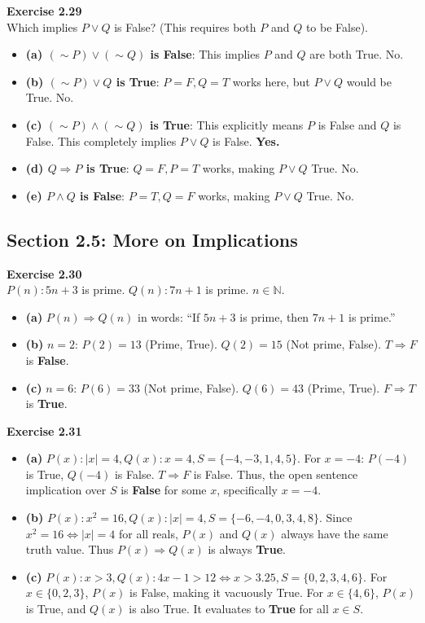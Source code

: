\documentclass[11pt]{article}
\begin{document}
\vspace{10pt}
\textbf{Exercise 2.29} \\
Which implies $P \vee Q$ is False? (This requires both $P$ and $Q$ to be False).
\begin{itemize}
    \item \textbf{(a) $(\sim P) \vee (\sim Q)$ is False}: This implies $P$ and $Q$ are both True. No.
    \item \textbf{(b) $(\sim P) \vee Q$ is True}: $P=F, Q=T$ works here, but $P \vee Q$ would be True. No.
    \item \textbf{(c) $(\sim P) \wedge (\sim Q)$ is True}: This explicitly means $P$ is False and $Q$ is False. This completely implies $P \vee Q$ is False. \textbf{Yes.}
    \item \textbf{(d) $Q \Rightarrow P$ is True}: $Q=F, P=T$ works, making $P \vee Q$ True. No.
    \item \textbf{(e) $P \wedge Q$ is False}: $P=T, Q=F$ works, making $P \vee Q$ True. No.
\end{itemize}

\subsection{Section 2.5: More on Implications}

\textbf{Exercise 2.30} \\
$P(n): 5n+3$ is prime. $Q(n): 7n+1$ is prime. $n \in \mathbb{N}$.
\begin{itemize}
    \item \textbf{(a)} $P(n) \Rightarrow Q(n)$ in words: ``If $5n+3$ is prime, then $7n+1$ is prime.''
    \item \textbf{(b)} $n=2$: $P(2) = 13$ (Prime, True). $Q(2) = 15$ (Not prime, False). $T \Rightarrow F$ is \textbf{False}.
    \item \textbf{(c)} $n=6$: $P(6) = 33$ (Not prime, False). $Q(6) = 43$ (Prime, True). $F \Rightarrow T$ is \textbf{True}.
\end{itemize}

\vspace{10pt}
\textbf{Exercise 2.31} \\
\begin{itemize}
    \item \textbf{(a)} $P(x): |x|=4, Q(x): x=4, S=\{-4,-3,1,4,5\}$.
    For $x=-4$: $P(-4)$ is True, $Q(-4)$ is False. $T \Rightarrow F$ is False. Thus, the open sentence implication over $S$ is \textbf{False} for some $x$, specifically $x=-4$.
    \item \textbf{(b)} $P(x): x^2=16, Q(x): |x|=4, S=\{-6,-4,0,3,4,8\}$.
    Since $x^2=16 \Leftrightarrow |x|=4$ for all reals, $P(x)$ and $Q(x)$ always have the same truth value. Thus $P(x) \Rightarrow Q(x)$ is always \textbf{True}.
    \item \textbf{(c)} $P(x): x>3, Q(x): 4x-1 > 12 \Leftrightarrow x > 3.25, S=\{0,2,3,4,6\}$.
    For $x \in \{0,2,3\}$, $P(x)$ is False, making it vacuously True. For $x \in \{4,6\}$, $P(x)$ is True, and $Q(x)$ is also True. It evaluates to \textbf{True} for all $x \in S$.
\end{itemize}
\end{document}
